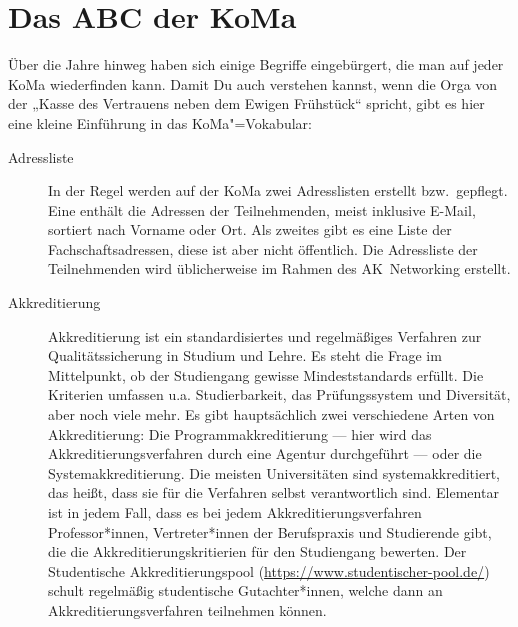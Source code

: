 \chapter{Das ABC der KoMa}



Über die Jahre hinweg haben sich einige Begriffe eingebürgert, die man auf jeder KoMa wiederfinden kann. Damit Du auch verstehen kannst, wenn die Orga von der „Kasse des Vertrauens neben dem Ewigen Frühstück“ spricht, gibt es hier eine kleine Einführung in das KoMa"=Vokabular:

\begin{description}

\item[Adressliste]
    In der Regel werden auf der KoMa zwei Adresslisten erstellt bzw.\ gepflegt. Eine enthält die Adressen der Teilnehmenden, meist inklusive E-Mail, sortiert nach Vorname oder Ort.  Als zweites gibt es eine Liste der Fachschaftsadressen, diese ist aber nicht öffentlich. Die Adressliste der Teilnehmenden wird üblicherweise im Rahmen des AK~Networking erstellt.

\item[Akkreditierung]
    Akkreditierung ist ein standardisiertes und regelmäßiges Verfahren zur Qualitätssicherung in Studium und Lehre. Es steht die Frage im Mittelpunkt, ob der Studiengang gewisse Mindeststandards erfüllt. Die Kriterien umfassen u.a. Studierbarkeit, das Prüfungssystem und Diversität, aber noch viele mehr. Es gibt hauptsächlich zwei verschiedene Arten von Akkreditierung: Die Programmakkreditierung — hier wird das Akkreditierungsverfahren durch eine Agentur durchgeführt — oder die Systemakkreditierung. Die meisten Universitäten sind systemakkreditiert, das heißt, dass sie für die Verfahren selbst verantwortlich sind. Elementar ist in jedem Fall, dass es bei jedem Akkreditierungsverfahren Professor*innen, Vertreter*innen der Berufspraxis und Studierende gibt, die die Akkreditierungskritierien für den Studiengang bewerten. Der Studentische Akkreditierungspool (\url{https://www.studentischer-pool.de/}) schult regelmäßig studentische Gutachter*innen, welche dann an Akkreditierungsverfahren teilnehmen können.


\end{description}
